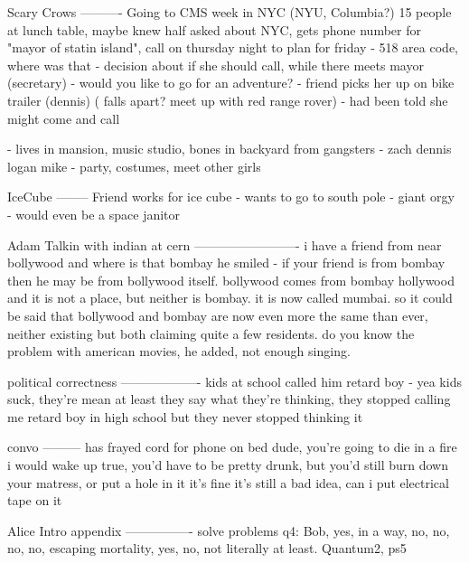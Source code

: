 Scary Crows
----------
Going to CMS week in NYC (NYU, Columbia?)
 15 people at lunch table, maybe knew half
 asked about NYC, gets phone number for "mayor of statin island", call on thursday night to plan for friday
 - 518 area code, where was that
 - decision about if she should call, while there meets mayor (secretary)
  - would you like to go for an adventure?
   - friend picks her up on bike trailer (dennis)
    ( falls apart? meet up with red range rover)
   - had been told she might come and call
   
  - lives in mansion, music studio, bones in backyard from gangsters
  - zach dennis logan mike
  - party, costumes, meet other girls 



IceCube
--------
Friend works for ice cube
 - wants to go to south pole
  - giant orgy
  - would even be a space janitor


Adam Talkin with indian at cern
-------------------------
i have a friend from near bollywood
and where is that
bombay
he smiled - if your friend is from bombay then he may be from bollywood itself. bollywood comes from bombay hollywood and it is not a place, but neither is bombay. it is now called mumbai. so it could be said that bollywood and bombay are now even more the same than ever, neither existing but both claiming quite a few residents. do you know the problem with american movies, he added, not enough singing.

political correctness
-------------------
kids at school called him retard boy 
 - yea kids suck, they're mean
at least they say what they're thinking, they stopped calling me retard boy in high school but they never stopped thinking it


convo
---------
 has frayed cord for phone on bed
 dude, you're going to die in a fire
 i would wake up
 true, you'd have to be pretty drunk, but you'd still burn down your matress, or put a hole in it
 it's fine
 it's still a bad idea, can i put electrical tape on it

Alice Intro appendix
----------------
solve problems
q4: 
Bob, yes, in a way, no, no, no, no, escaping mortality, yes, no, not literally at least.
Quantum2, ps5
